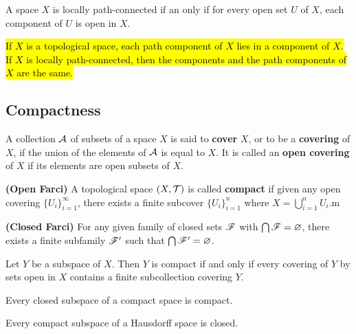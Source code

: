 \vs

\begin{thm}
A space $X$ is locally path-connected if an only if for every open set $U$ of $X$, each component of $U$ is open in $X$.
\end{thm}

\vs

\begin{thm}
\hl{If $X$ is a topological space, each path component of $X$ lies in a component of $X$. If $X$ is locally path-connected, then the components and the path components of $X$ are the same.}
\end{thm}


\subsection{Compactness}\nl
\setcounter{section}{26}
\setcounter{thm}{0}

\dfn A collection $\mathcal{A}$ of subsets of a space $X$ is said to \textbf{cover} $X$, or to be a \textbf{covering} of $X$, if the union of the elements of $\mathcal{A}$ is equal to $X$. It is called an \textbf{open covering} of $X$ if its elements are open subsets of $X$.

\dfn \textbf{(Open Farci)} A topological space $(X, \mathcal{T})$ is called \textbf{compact} if given any open covering $\{U_i\}_{i = 1}^\infty$, there exists a finite subcover $\{U_i\}_{i = 1}^n$ where $X = \bigcup_{i = 1}^n U_i$.m 

\dfn \textbf{(Closed Farci)} For any given family of closed sets $\mathscr{F}$ with $\bigcap \mathscr{F} = \varnothing$, there exists a finite subfamily $\mathscr{F}^\prime$ such that $\bigcap\mathscr{F}^\prime = \varnothing$.

\vs

\begin{lem}
Let $Y$ be a subspace of $X$. Then $Y$ is compact if and only if every covering of $Y$ by sets open in $X$ contains a finite subcollection covering $Y$.
\end{lem}

\vs

\begin{thm}
Every closed subspace of a compact space is compact.
\end{thm}

\vs

\begin{thm}
Every compact subspace of a Hausdorff space is closed.
\end{thm}

